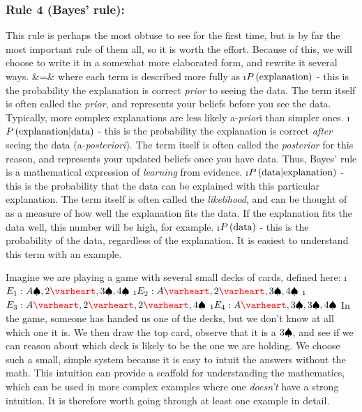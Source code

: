 \subsubsection{Rule 4 (Bayes' rule):}\label{sec:rule4} This rule is perhaps the most obtuse to see for the first time, but is by far the most important rule of them all, so it is worth the effort.  Because of this, we will choose to write it in a somewhat more elaborated form, and rewrite it several ways.
\beqn
{} &=& 
\eeqn
where each term is described more fully as 
\bi
\i $\P{explanation}$ - this is the probability the explanation is correct {\em prior} to seeing the data.  The term itself is often called the {\em prior}, and represents your beliefs before you see the data.  Typically, more complex explanations are less likely a-{\em prior}i than simpler ones.  
\i $\Pg{explanation}{data}$ - this is the probability the explanation is correct {\em after} seeing the data (a-{\em posteriori}). The term itself is often called the {\em posterior} for this reason, and represents your updated beliefs once you have data.  Thus, Bayes' rule is a mathematical expression of {\em learning} from evidence.  
\i $\Pg{data}{explanation}$ - this is the probability that the data can be explained with this particular explanation.  The term itself is often called the {\em likelihood}, and can be thought of as a measure of how well the explanation fits the data.  If the explanation fits the data well, this number will be high, for example. 
\i $\P{data}$ - this is the probability of the data, regardless of the explanation.  It is easiest to understand this term with an example.
\ei

Imagine we are playing a game with several small decks of cards, defined here:
\be
\i $E_1: A\spades, 2\hearts, 3\spades,4\spades$
\i $E_2: A\hearts, 2\hearts, 3\spades, 4\spades$
\i $E_3: A\hearts,2\hearts, 2\hearts,4\spades$
\i $E_4: A\hearts,3\spades, 3\spades, 4\spades$
\ee
In the game, someone has handed us one of the decks, but we don't know at all which one it is.  We then draw the top card, observe that it is a $3\spades$, and see if we can reason about which deck is likely to be the one we are holding.  We choose such a small, simple system because it is easy to intuit the answers without the math.  This intuition can provide a scaffold for understanding the mathematics, which can be used in more complex examples where one {\em doesn't} have a strong intuition.  It is therefore worth going through at least one example in detail.

